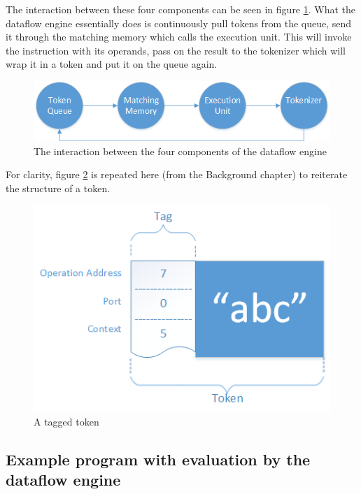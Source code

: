 The interaction between these four components can be seen in figure \ref{fig:engine-architecture-tokenprocessing}. 
What the dataflow engine essentially does is continuously pull tokens from the queue, send it through the matching memory which calls the execution unit. This will invoke the instruction with its operands, pass on the result to the tokenizer which will wrap it in a token and put it on the queue again. 

\begin{figure}[h!]
	\includegraphics[width=\textwidth]{images/Engine-Architecture-TokenProcessing.png}
	\caption{The interaction between the four components of the dataflow engine}
	\label{fig:engine-architecture-tokenprocessing}
\end{figure}

\newpage

For clarity, figure \ref{fig:background-dataflow-token-again} is repeated here (from the Background chapter) to reiterate the structure of a token. 

\begin{figure}[ht]
	\centerline{\includegraphics[width=\textwidth]{images/background-dataflow-token.png}}
	\caption{A tagged token}
	\label{fig:background-dataflow-token-again}
\end{figure}


\subsection{Example program with evaluation by the dataflow engine}

